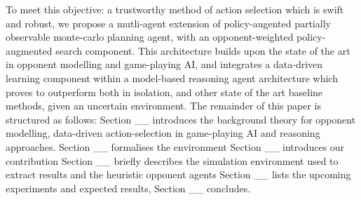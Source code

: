 To meet this objective: a trustworthy method of action selection which is swift and robust, we propose a mutli-agent extension of policy-augented partially observable monte-carlo planning agent, with an opponent-weighted policy-augmented search component. This architecture builds upon the state of the art in opponent modelling and game-playing AI, and integrates a data-driven learning component within a model-based reasoning agent architecture which proves to outperform both in isolation, and other state of the art baseline methods, given an uncertain environment.  
\newline \newline
The remainder of this paper is structured as follows: Section __ introduces the background theory for opponent modelling, data-driven action-selection in game-playing AI and reasoning approaches. 
Section __ formalises the environment
Section __ introduces our contribution
Section __ briefly describes the simulation environment used to extract results and the heuristic opponent agents
Section __ lists the upcoming experiments and expected results, 
Section __ concludes. 